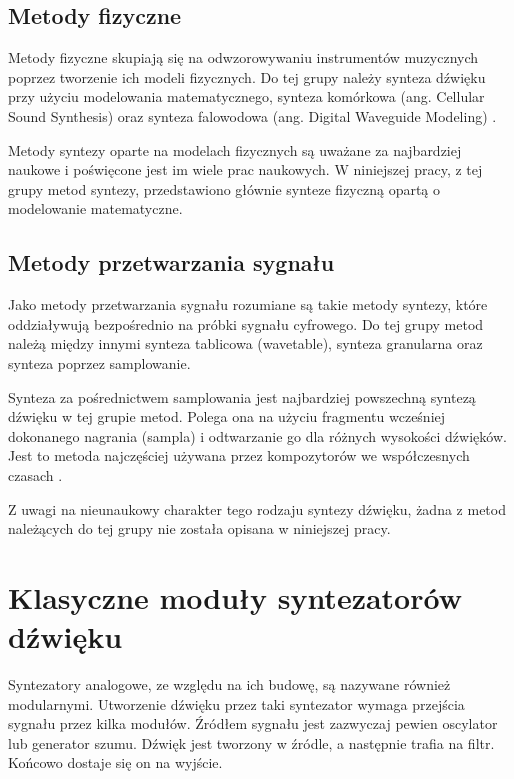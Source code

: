 \subsection{Metody fizyczne}
Metody fizyczne skupiają się na odwzorowywaniu instrumentów muzycznych poprzez tworzenie ich modeli fizycznych. Do tej grupy należy synteza dźwięku przy użyciu modelowania matematycznego, synteza komórkowa (ang. Cellular Sound Synthesis) oraz synteza falowodowa (ang. Digital Waveguide Modeling) \cite{czyzewski_dzwiek_cyfrowy}.

Metody syntezy oparte na modelach fizycznych są uważane za najbardziej naukowe i poświęcone jest im wiele prac naukowych. W niniejszej pracy, z tej grupy metod syntezy, przedstawiono głównie synteze fizyczną opartą o modelowanie matematyczne.

\subsection{Metody przetwarzania sygnału}
Jako metody przetwarzania sygnału rozumiane są takie metody syntezy, które oddziaływują bezpośrednio na próbki sygnału cyfrowego. Do tej grupy metod należą między innymi synteza tablicowa (wavetable), synteza granularna oraz synteza poprzez samplowanie.

Synteza za pośrednictwem samplowania jest najbardziej powszechną syntezą dźwięku w tej grupie metod. Polega ona na użyciu fragmentu wcześniej dokonanego nagrania (sampla) i odtwarzanie go dla różnych wysokości dźwięków. Jest to metoda najczęściej używana przez kompozytorów we współczesnych czasach \cite{misra_cook_przetw_syg}.

Z uwagi na nieunaukowy charakter tego rodzaju syntezy dźwięku, żadna z metod należących do tej grupy nie została opisana w niniejszej pracy.



\section{Klasyczne moduły syntezatorów dźwięku}
Syntezatory analogowe, ze względu na ich budowę, są nazywane również modularnymi. Utworzenie dźwięku przez taki syntezator wymaga przejścia sygnału przez kilka modułów. Źródłem sygnału jest zazwyczaj pewien oscylator lub generator szumu. Dźwięk jest tworzony w źródle, a następnie trafia na filtr. Końcowo dostaje się on na wyjście.

